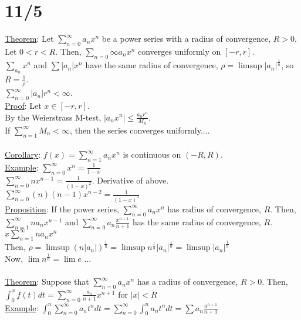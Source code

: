 \documentclass[11pt]{article}
\begin{document}
\section*{11/5}
	\underline{Theorem}: Let $\sum_{n = 0}^{\infty} a_n x^n$ be a power series
	with a radius of convergence, $R > 0$. Let $0 < r < R$. Then, 
	$\sum_{n = 0}{\infty} a_n x^n$ converges uniformly on $[-r, r]$.\\
	$\sum_{a_n}{x^n}$ and $\sum |a_n| x^n$ have the same radius of convergence,
	$\rho = \limsup |a_n|^{\frac{1}{n}}$, so $R = \frac{1}{\rho}$.\\
	$\sum_{n = 0}^{\infty} |a_n| r^n < \infty$.\\
	\underline{Proof}:	Let $x \in [-r, r]$.\\
	By the Weierstrass M-test, $|a_n x^n| \le \frac{a_nr^n}{M_n}$.\\
	If $\sum_{n = 1}^{\infty} M_n < \infty$, then the series converges
	uniformly.$\ldots$\\\\
%
	\underline{Corollary}: $f(x) = \sum_{n = 1}^{\infty} a_nx^n$ is continuous
	on $(-R, R)$.\\
	\underline{Example}: $\sum_{n = 0}^{\infty} x^n = \frac{1}{1- x}$\\
	$\sum_{n = 0}^{\infty} nx^{n-1} = \frac{1}{(1-x)^2}$. Derivative of
	above.\\
	$\sum_{n = 0}^{\infty} (n)(n-1)x^{n-2} = \frac{1}{(1-x)^3}$\\
	\underline{Proposition}: If the power series, $\sum_{n = 0}^{\infty}
	a_n x^n$ has radius of convergence, $R$. Then, $\sum_{n = 1}^{\infty}
	na_n x^{n - 1}$ and $\sum_{n = 0}^{\infty} a_n \frac{x^{n+1}}{n+1}$
	has the same radius of convergence, $R$.\\
	$x \sum_{n = 1}^{\infty} na_nx^n$\\
	Then, $\rho = \limsup (n|a_n|)^{\frac{1}{n}} = \limsup n^{\frac{1}{n}}
	|a_n|^\frac{1}{n} = \limsup |a_n|^{\frac{1}{n}}$\\
	Now, $\lim n^{\frac{1}{n}} = \lim e$ $\ldots$\\\\
%
	\underline{Theorem}: Suppose that $\sum_{n = 0}^{\infty} a_n x^n$ has
	a radius of convergence, $R > 0$. Then, $\int_0^x f(t)dt = 
	\sum_{n = 0}^{\infty} \frac{a_n}{n+1}x^{n+1}$ for $|x| < R$\\
	\underline{Example}: $\int_0^n{\sum_{n = 0}^{\infty}a_nt^n dt} = 
	\sum_{n = 0}^{\infty}\int_0^n{a_nt^n dt} = \sum a_n \frac{a^{n+1}}{n+1}$
\end{document}
